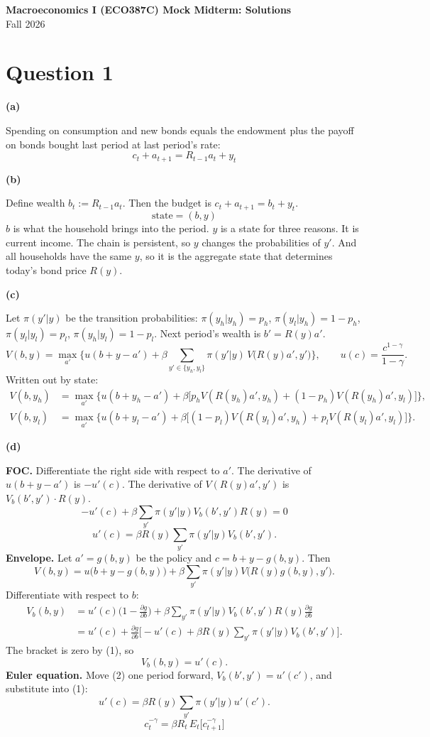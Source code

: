 \documentclass[12pt]{article}
\newcommand{\E}{E}
\newcommand{\pt}[1]{\par\bigskip\textbf{(#1)}\par}
\newcommand{\ans}[1]{\[\boxed{\ #1\ }\]}
\begin{document}
\begin{center}
{\large\bfseries Macroeconomics I (ECO387C) Mock Midterm: Solutions}\\[1mm]
Fall 2026
\end{center}

\section*{Question 1}

\pt{a}
Spending on consumption and new bonds equals the endowment plus the payoff
on bonds bought last period at last period's rate:
\ans{c_t+a_{t+1}=R_{t-1}a_t+y_t}

\pt{b}
Define wealth $b_t:=R_{t-1}a_t$. Then the budget is $c_t+a_{t+1}=b_t+y_t$.
\ans{\text{state}=(b,y)}
$b$ is what the household brings into the period. $y$ is a state for three
reasons. It is current income. The chain is persistent, so $y$ changes the
probabilities of $y'$. And all households have the same $y$, so it is the
aggregate state that determines today's bond price $R(y)$.

\pt{c}
Let $\pi(y'|y)$ be the transition probabilities: $\pi(y_h|y_h)=p_h$,
$\pi(y_l|y_h)=1-p_h$, $\pi(y_l|y_l)=p_l$, $\pi(y_h|y_l)=1-p_l$. Next
period's wealth is $b'=R(y)a'$.
\[
V(b,y)=\max_{a'}\Big\{u(b+y-a')+\beta\sum_{y'\in\{y_h,y_l\}}\pi(y'|y)\,V\big(R(y)a',y'\big)\Big\},\qquad u(c)=\frac{c^{1-\gamma}}{1-\gamma}.
\]
Written out by state:
\begin{align*}
V(b,y_h)&=\max_{a'}\Big\{u(b+y_h-a')+\beta\big[p_hV(R(y_h)a',y_h)+(1-p_h)V(R(y_h)a',y_l)\big]\Big\},\\
V(b,y_l)&=\max_{a'}\Big\{u(b+y_l-a')+\beta\big[(1-p_l)V(R(y_l)a',y_h)+p_lV(R(y_l)a',y_l)\big]\Big\}.
\end{align*}

\pt{d}
\textbf{FOC.} Differentiate the right side with respect to $a'$. The
derivative of $u(b+y-a')$ is $-u'(c)$. The derivative of $V(R(y)a',y')$ is
$V_b(b',y')\cdot R(y)$.
\[
-u'(c)+\beta\sum_{y'}\pi(y'|y)V_b(b',y')R(y)=0
\]
\[
u'(c)=\beta R(y)\sum_{y'}\pi(y'|y)V_b(b',y').\tag{1}
\]
\textbf{Envelope.} Let $a'=g(b,y)$ be the policy and $c=b+y-g(b,y)$. Then
\[
V(b,y)=u\big(b+y-g(b,y)\big)+\beta\sum_{y'}\pi(y'|y)V\big(R(y)g(b,y),y'\big).
\]
Differentiate with respect to $b$:
\begin{align*}
V_b(b,y)&=u'(c)\Big(1-\frac{\partial g}{\partial b}\Big)+\beta\sum_{y'}\pi(y'|y)V_b(b',y')R(y)\frac{\partial g}{\partial b}\\
&=u'(c)+\frac{\partial g}{\partial b}\Big[-u'(c)+\beta R(y)\sum_{y'}\pi(y'|y)V_b(b',y')\Big].
\end{align*}
The bracket is zero by (1), so
\[
V_b(b,y)=u'(c).\tag{2}
\]
\textbf{Euler equation.} Move (2) one period forward, $V_b(b',y')=u'(c')$,
and substitute into (1):
\[
u'(c)=\beta R(y)\sum_{y'}\pi(y'|y)u'(c').
\]
\ans{c_t^{-\gamma}=\beta R_t\,\E_t\big[c_{t+1}^{-\gamma}\big]}
\end{document}
